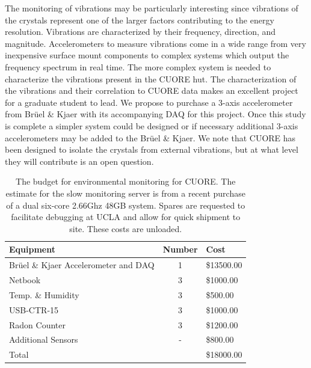 The monitoring of vibrations may be particularly interesting since vibrations of the crystals represent one of the larger factors contributing to the energy resolution\cite{vignati}. Vibrations are characterized by their frequency, direction, and magnitude. Accelerometers to measure vibrations come in a wide range from very inexpensive surface mount components to complex systems which output the frequency spectrum in real time. The more complex system is needed to characterize the vibrations present in the CUORE hut. The characterization of the vibrations and their correlation to CUORE data makes an excellent project for a graduate student to lead. We propose to purchase a 3-axis accelerometer from  Br\"{u}el \& Kjaer\cite{bk}  with its accompanying DAQ for this project. Once this study is complete a simpler system could be designed or if necessary additional 3-axis accelerometers may be added to the  Br\"{u}el \& Kjaer. We note that CUORE has been designed to isolate the crystals from external vibrations, but at what level they will contribute is an open question.

\begin{table}[position specifier]
\begin{center}
\begin{tabular}{ l c l}
\hline
Equipment & Number & Cost \\
\hline
Br\"{u}el \& Kjaer Accelerometer and DAQ & 1 & \$13500.00 \\
Netbook & 3 & \$1000.00\\
Temp. \& Humidity & 3 & \$500.00 \\
USB-CTR-15 & 3 & \$1000.00\\
Radon Counter & 3 & \$1200.00\\
Additional Sensors & - & \$800.00 \\
\hline
Total & & \$18000.00 \\
\hline
\end{tabular}
\caption{\label{slowRequest}The budget for environmental monitoring for CUORE. The estimate for the slow monitoring server is from a recent purchase of a dual six-core 2.66Ghz 48GB system. Spares are requested to facilitate debugging at UCLA and allow for quick shipment to site. These costs are unloaded.}
\end{center}
\end{table}

